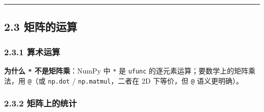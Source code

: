 \begin{center}\rule{0.5\linewidth}{0.5pt}\end{center}

\subsection{2.3 矩阵的运算}\label{ux77e9ux9635ux7684ux8fd0ux7b97}

\subsubsection{2.3.1 算术运算}\label{ux7b97ux672fux8fd0ux7b97}

\begin{Shaded}
\begin{Highlighting}[]
\OperatorTok{=}\NormalTok{ np.array([[}\NormalTok{, }\NormalTok{], [}\NormalTok{, }\NormalTok{]])}
\OperatorTok{=}\NormalTok{ np.array([[}\NormalTok{, }\NormalTok{], [}\NormalTok{, }\NormalTok{]])}

\OperatorTok{+}
\OperatorTok{{-}}
\OperatorTok{*}
\end{Highlighting}
\end{Shaded}

\textbf{为什么 \texttt{*} 不是矩阵乘}：NumPy 中 \texttt{*} 是
\texttt{ufunc} 的逐元素运算；要数学上的矩阵乘法，用 \texttt{@}（或
\texttt{np.dot} / \texttt{np.matmul}，二者在 2D 下等价，但 \texttt{@}
语义更明确）。

\subsubsection{2.3.2
矩阵上的统计}\label{ux77e9ux9635ux4e0aux7684ux7edfux8ba1}

